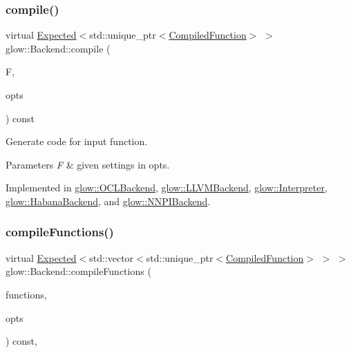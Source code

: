 \subsubsection{\texorpdfstring{compile()}{compile()}}
{\footnotesize\ttfamily virtual \hyperlink{classglow_1_1detail_1_1_glow_expected}{Expected}$<$std\+::unique\+\_\+ptr$<$\hyperlink{classglow_1_1_compiled_function}{Compiled\+Function}$>$ $>$ glow\+::\+Backend\+::compile (\begin{DoxyParamCaption}\item[{\hyperlink{classglow_1_1_function}{Function} $\ast$}]{F,  }\item[{const \hyperlink{structglow_1_1_backend_options}{Backend\+Options} \&}]{opts }\end{DoxyParamCaption}) const\hspace{0.3cm}{\ttfamily [pure virtual]}}



Generate code for input function. 


\begin{DoxyParams}{Parameters}
{\em F} & given settings in {\ttfamily opts}. \\
\hline
\end{DoxyParams}


Implemented in \hyperlink{classglow_1_1_o_c_l_backend_a0a058f7b6eac1efea438e171e56d9c6e}{glow\+::\+O\+C\+L\+Backend}, \hyperlink{classglow_1_1_l_l_v_m_backend_a914fa04325ef3ba9d345f507795ba3f2}{glow\+::\+L\+L\+V\+M\+Backend}, \hyperlink{classglow_1_1_interpreter_a1de9a9294a6ede268ca5b13f980be67e}{glow\+::\+Interpreter}, \hyperlink{classglow_1_1_habana_backend_a0dfa74ae240460b996248124ad726690}{glow\+::\+Habana\+Backend}, and \hyperlink{classglow_1_1_n_n_p_i_backend_af773c63c90b4d6c89c75c0057e5a6157}{glow\+::\+N\+N\+P\+I\+Backend}.

\mbox{\label{classglow_1_1_backend_a23cf5c4fea89d0c34be2a3721a7f8f3f}} 
\subsubsection{\texorpdfstring{compile\+Functions()}{compileFunctions()}}
{\footnotesize\ttfamily virtual \hyperlink{classglow_1_1detail_1_1_glow_expected}{Expected}$<$std\+::vector$<$std\+::unique\+\_\+ptr$<$\hyperlink{classglow_1_1_compiled_function}{Compiled\+Function}$>$ $>$ $>$ glow\+::\+Backend\+::compile\+Functions (\begin{DoxyParamCaption}\item[{llvm\+::\+Array\+Ref$<$ \hyperlink{classglow_1_1_function}{Function} $\ast$$>$}]{functions,  }\item[{\hyperlink{structglow_1_1_backend_options}{Backend\+Options} \&}]{opts }\end{DoxyParamCaption}) const\hspace{0.3cm}{\ttfamily [inline]}, {\ttfamily [virtual]}}

